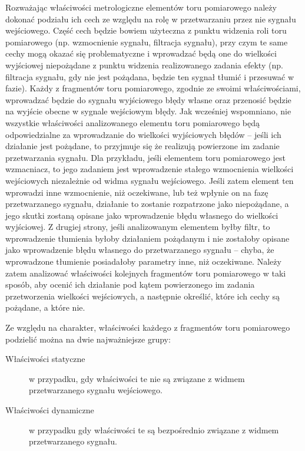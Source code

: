 Rozważając właściwości metrologiczne elementów toru pomiarowego należy dokonać podziału ich cech ze względu na rolę w przetwarzaniu przez nie sygnału wejściowego. Część cech będzie bowiem użyteczna z punktu widzenia roli toru pomiarowego (np. wzmocnienie sygnału, filtracja sygnału), przy czym te same cechy mogą okazać się problematyczne i wprowadzać będą one do wielkości wyjściowej niepożądane z punktu widzenia realizowanego zadania efekty (np. filtracja sygnału, gdy nie jest pożądana, będzie ten sygnał tłumić i przesuwać w fazie). Każdy z fragmentów toru pomiarowego, zgodnie ze swoimi właściwościami, wprowadzać będzie do sygnału wyjściowego błędy własne oraz przenosić będzie na wyjście obecne w sygnale wejściowym błędy. Jak wcześniej wspomniano, nie wszystkie właściwości analizowanego elementu toru pomiarowego będą odpowiedzialne za wprowadzanie do wielkości wyjściowych błędów -- jeśli ich działanie jest pożądane, to przyjmuje się że realizują powierzone im zadanie przetwarzania sygnału. Dla przykładu, jeśli elementem toru pomiarowego jest wzmacniacz, to jego zadaniem jest wprowadzenie stałego wzmocnienia wielkości wejściowych niezależnie od widma sygnału wejściowego. Jeśli zatem element ten wprowadzi inne wzmocnienie, niż oczekiwane, lub też wpłynie on na fazę przetwarzanego sygnału, działanie to zostanie rozpatrzone jako niepożądane, a jego skutki zostaną opisane jako wprowadzenie błędu własnego do wielkości wyjściowej. Z drugiej strony, jeśli analizowanym elementem byłby filtr, to wprowadzenie tłumienia byłoby działaniem pożądanym i nie zostałoby opisane jako wprowadzenie błędu własnego do przetwarzanego sygnału -- chyba, że wprowadzone tłumienie posiadałoby parametry inne, niż oczekiwane. Należy zatem analizować właściwości kolejnych fragmentów toru pomiarowego w taki sposób, aby ocenić ich działanie pod kątem powierzonego im zadania przetworzenia wielkości wejściowych, a następnie określić, które ich cechy są pożądane, a które nie.

Ze względu na charakter, właściwości każdego z fragmentów toru pomiarowego podzielić można na dwie najważniejsze grupy:
\begin{description}
\item [Właściwości statyczne] w przypadku, gdy właściwości te nie są związane z widmem przetwarzanego sygnału wejściowego.
\item [Właściwości dynamiczne] w przypadku gdy właściwości te są bezpośrednio związane z widmem przetwarzanego sygnału.
\end{description}

